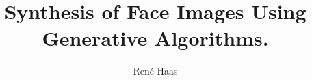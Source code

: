 \documentclass{masterthesis}
\title{Synthesis of Face Images Using Generative Algorithms.}
\author{René Haas}
\begin{document}
\maketitle
\makefrontmatter





\clearpage
\makebibliography
\end{document}
